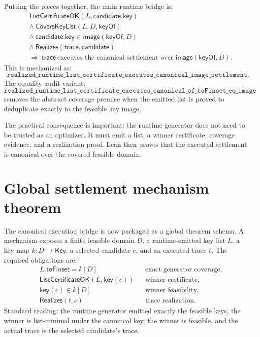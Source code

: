 \documentclass[11pt]{article}
\theoremstyle{remark}
\begin{document}
Putting the pieces together, the main runtime bridge is:
\[
\begin{aligned}
&\mathsf{ListCertificateOK}(L,\mathsf{candidate.key})\\
&\land\ \mathsf{CoversKeyList}(L,D,\mathsf{keyOf})\\
&\land\ \mathsf{candidate.key}\in \mathsf{image}(\mathsf{keyOf},D)\\
&\land\ \mathsf{Realizes}(\mathsf{trace},\mathsf{candidate})\\
&\Longrightarrow\ \mathsf{trace}\ \text{executes the canonical settlement over }
  \mathsf{image}(\mathsf{keyOf},D).
\end{aligned}
\]
This is mechanized as:
\[
  \texttt{realized\_runtime\_list\_certificate\_executes\_canonical\_image\_settlement}.
\]
The equality-audit variant:
\[
  \texttt{realized\_runtime\_list\_certificate\_executes\_canonical\_of\_toFinset\_eq\_image}
\]
removes the abstract coverage premise when the emitted list is proved to
deduplicate exactly to the feasible key image.

The practical consequence is important: the runtime generator does not need to
be trusted as an optimizer.  It must emit a list, a winner certificate, coverage
evidence, and a realization proof.  Lean then proves that the executed settlement
is canonical over the covered feasible domain.

\section{Global settlement mechanism theorem}
\label{sec:global-mechanism}

The canonical execution bridge is now packaged as a global theorem schema.  A
mechanism exposes a finite feasible domain $D$, a runtime-emitted key list $L$,
a key map $k:D\to \mathsf{Key}$, a selected candidate $c$, and an executed trace
$t$.  The required obligations are:
\[
\begin{aligned}
  &L.\mathsf{toFinset} = k[D] && \text{exact generator coverage},\\
  &\mathsf{ListCertificateOK}(L,\mathsf{key}(c)) && \text{winner certificate},\\
  &\mathsf{key}(c)\in k[D] && \text{winner feasibility},\\
  &\mathsf{Realizes}(t,c) && \text{trace realization}.
\end{aligned}
\]
Standard reading: the runtime generator emitted exactly the feasible keys, the
winner is list-minimal under the canonical key, the winner is feasible, and the
actual trace is the selected candidate's trace.
\end{document}
